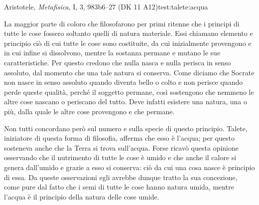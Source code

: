 \begin{testimonianza}{Aristotele, \emph{Metafisica}, I, 3, 983b6--27 (DK 11 A12)}{test:talete:acqua}
\smallskip
{}\par
La maggior parte di coloro che filosofarono per primi ritenne che i principi di tutte le cose fossero soltanto quelli di natura materiale. Essi chiamano elemento e principio ciò di cui tutte le cose sono costituite, da cui inizialmente provengono e in cui infine si dissolvono, mentre la sostanza permane e mutano le sue caratteristiche. Per questo credono che nulla nasca e nulla perisca in senso assoluto, dal momento che una tale natura si conserva. Come diciamo che Socrate non nasce in senso assoluto quando diventa bello o colto e non perisce quando perde queste qualità, perché il soggetto permane, così sostengono che nemmeno le altre cose nascano o periscano del tutto. Deve infatti esistere una natura, una o più, dalla quale le altre cose provengono e che permane.

Non tutti concordano però sul numero e sulla specie di questo principio. Talete, iniziatore di questa forma di filosofia, afferma che esso è l'acqua; per questo sosteneva anche che la Terra si trova sull'acqua. Forse ricavò questa opinione osservando che il nutrimento di tutte le cose è umido e che anche il calore si genera dall'umido e grazie a esso si conserva: ciò da cui una cosa nasce è principio di essa. Da queste osservazioni egli avrebbe dunque tratto la sua concezione, come pure dal fatto che i semi di tutte le cose hanno natura umida, mentre l'acqua è il principio della natura delle cose umide.
\end{testimonianza}


